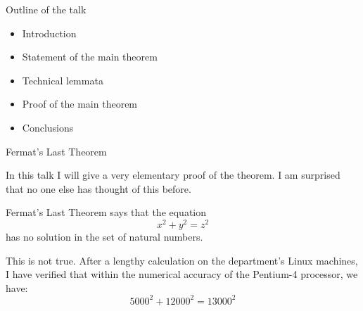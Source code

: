 \documentclass[sans,mathserif]{beamer}
\begin{document}

\begin{frame}{Outline of the talk} 
 
\begin{itemize} 
  \item Introduction 
  \pause 
  \item Statement of the main theorem 
  \pause 
  \item Technical lemmata 
  \pause 
  \item Proof of the main theorem 
  \pause 
  \item Conclusions 
\end{itemize} 

\end{frame}


\begin{frame}{Fermat's Last Theorem} 
 
In this talk I will give a very elementary proof of the 
theorem.  I am surprised that no one else has thought of 
this before. 
\medskip 
 
\pause 
 
Fermat's Last Theorem says that the equation 
\[ 
  x^2 + y^2 = z^2 
\] 
has no solution in the set of natural numbers. 
\medskip 
 
\pause 
 
This is not true.  After a lengthy calculation on the 
department's Linux machines, I have verified that within 
the numerical accuracy of the Pentium-4 processor, we have: 
\[ 
  5000^2 + 12000^2 = 13000^2 
\] 
 
\end{frame}



\end{document}
